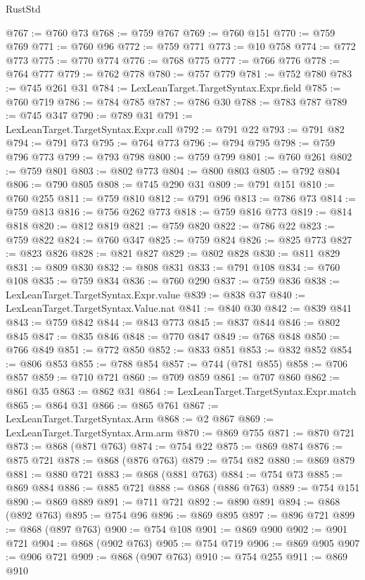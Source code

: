 \begin{lexlean}{RustStd}
\begin{coremodule}
@767 := @760 @73
@768 := @759 @767
@769 := @760 @151
@770 := @759 @769
@771 := @760 @96
@772 := @759 @771
@773 := @10 @758
@774 := @772 @773
@775 := @770 @774
@776 := @768 @775
@777 := @766 @776
@778 := @764 @777
@779 := @762 @778
@780 := @757 @779
@781 := @752 @780
@783 := @745 @261 @31
@784 := LexLeanTarget.TargetSyntax.Expr.field
@785 := @760 @719
@786 := @784 @785
@787 := @786 @30
@788 := @783 @787
@789 := @745 @347
@790 := @789 @31
@791 := LexLeanTarget.TargetSyntax.Expr.call
@792 := @791 @22
@793 := @791 @82
@794 := @791 @73
@795 := @764 @773
@796 := @794 @795
@798 := @759 @796 @773
@799 := @793 @798
@800 := @759 @799
@801 := @760 @261
@802 := @759 @801
@803 := @802 @773
@804 := @800 @803
@805 := @792 @804
@806 := @790 @805
@808 := @745 @290 @31
@809 := @791 @151
@810 := @760 @255
@811 := @759 @810
@812 := @791 @96
@813 := @786 @73
@814 := @759 @813
@816 := @756 @262 @773
@818 := @759 @816 @773
@819 := @814 @818
@820 := @812 @819
@821 := @759 @820
@822 := @786 @22
@823 := @759 @822
@824 := @760 @347
@825 := @759 @824
@826 := @825 @773
@827 := @823 @826
@828 := @821 @827
@829 := @802 @828
@830 := @811 @829
@831 := @809 @830
@832 := @808 @831
@833 := @791 @108
@834 := @760 @108
@835 := @759 @834
@836 := @760 @290
@837 := @759 @836
@838 := LexLeanTarget.TargetSyntax.Expr.value
@839 := @838 @37
@840 := LexLeanTarget.TargetSyntax.Value.nat
@841 := @840 @30
@842 := @839 @841
@843 := @759 @842
@844 := @843 @773
@845 := @837 @844
@846 := @802 @845
@847 := @835 @846
@848 := @770 @847
@849 := @768 @848
@850 := @766 @849
@851 := @772 @850
@852 := @833 @851
@853 := @832 @852
@854 := @806 @853
@855 := @788 @854
@857 := @744 (@781 @855)
@858 := @706 @857
@859 := @710 @721
@860 := @709 @859
@861 := @707 @860
@862 := @861 @35
@863 := @862 @31
@864 := LexLeanTarget.TargetSyntax.Expr.match
@865 := @864 @31
@866 := @865 @761
@867 := LexLeanTarget.TargetSyntax.Arm
@868 := @2 @867
@869 := LexLeanTarget.TargetSyntax.Arm.arm
@870 := @869 @755
@871 := @870 @721
@873 := @868 (@871 @763)
@874 := @754 @22
@875 := @869 @874
@876 := @875 @721
@878 := @868 (@876 @763)
@879 := @754 @82
@880 := @869 @879
@881 := @880 @721
@883 := @868 (@881 @763)
@884 := @754 @73
@885 := @869 @884
@886 := @885 @721
@888 := @868 (@886 @763)
@889 := @754 @151
@890 := @869 @889
@891 := @711 @721
@892 := @890 @891
@894 := @868 (@892 @763)
@895 := @754 @96
@896 := @869 @895
@897 := @896 @721
@899 := @868 (@897 @763)
@900 := @754 @108
@901 := @869 @900
@902 := @901 @721
@904 := @868 (@902 @763)
@905 := @754 @719
@906 := @869 @905
@907 := @906 @721
@909 := @868 (@907 @763)
@910 := @754 @255
@911 := @869 @910

\end{coremodule}
\end{lexlean}
